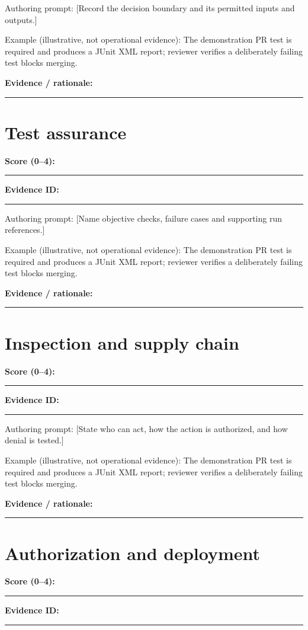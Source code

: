 \documentclass[11pt,letterpaper]{article}
\begin{document}
Authoring prompt: [Record the decision boundary and its permitted inputs and outputs.]

Example (illustrative, not operational evidence): The demonstration PR test is required and produces a JUnit XML report; reviewer verifies a deliberately failing test blocks merging.

\noindent\textbf{Evidence / rationale:}\par\nobreak\vspace{8pt}\noindent\rule{0.93\linewidth}{0.4pt}\par\vspace{14pt}
\section{Test assurance}
\noindent\textbf{Score (0--4):}\rule{2cm}{0.4pt}\quad\textbf{Evidence ID:}\rule{4cm}{0.4pt}

Authoring prompt: [Name objective checks, failure cases and supporting run references.]

Example (illustrative, not operational evidence): The demonstration PR test is required and produces a JUnit XML report; reviewer verifies a deliberately failing test blocks merging.

\noindent\textbf{Evidence / rationale:}\par\nobreak\vspace{8pt}\noindent\rule{0.93\linewidth}{0.4pt}\par\vspace{14pt}
\section{Inspection and supply chain}
\noindent\textbf{Score (0--4):}\rule{2cm}{0.4pt}\quad\textbf{Evidence ID:}\rule{4cm}{0.4pt}

Authoring prompt: [State who can act, how the action is authorized, and how denial is tested.]

Example (illustrative, not operational evidence): The demonstration PR test is required and produces a JUnit XML report; reviewer verifies a deliberately failing test blocks merging.

\noindent\textbf{Evidence / rationale:}\par\nobreak\vspace{8pt}\noindent\rule{0.93\linewidth}{0.4pt}\par\vspace{14pt}
\section{Authorization and deployment}
\noindent\textbf{Score (0--4):}\rule{2cm}{0.4pt}\quad\textbf{Evidence ID:}\rule{4cm}{0.4pt}
\end{document}
